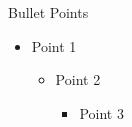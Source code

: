 \begin{frame}{Bullet Points}
  \begin{itemize}
    \item Point 1
    \begin{itemize}
        \item Point 2
        \begin{itemize}
            \item Point 3
        \end{itemize}
    \end{itemize}
  \end{itemize}
\end{frame}
